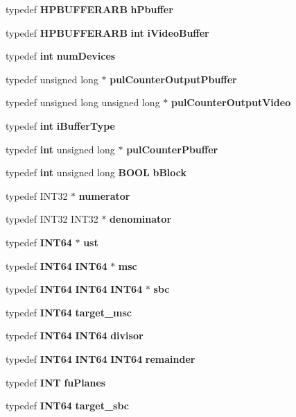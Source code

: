 \begin{DoxyCompactItemize}
\item 
typedef {\bf H\+P\+B\+U\+F\+F\+E\+R\+A\+RB} {\bf h\+Pbuffer}
\item 
typedef {\bf H\+P\+B\+U\+F\+F\+E\+R\+A\+RB} {\bf int} {\bf i\+Video\+Buffer}
\item 
typedef {\bf int} {\bf num\+Devices}
\item 
typedef unsigned long $\ast$ {\bf pul\+Counter\+Output\+Pbuffer}
\item 
typedef unsigned long unsigned long $\ast$ {\bf pul\+Counter\+Output\+Video}
\item 
typedef {\bf int} {\bf i\+Buffer\+Type}
\item 
typedef {\bf int} unsigned long $\ast$ {\bf pul\+Counter\+Pbuffer}
\item 
typedef {\bf int} unsigned long {\bf B\+O\+OL} {\bf b\+Block}
\item 
typedef I\+N\+T32 $\ast$ {\bf numerator}
\item 
typedef I\+N\+T32 I\+N\+T32 $\ast$ {\bf denominator}
\item 
typedef {\bf I\+N\+T64} $\ast$ {\bf ust}
\item 
typedef {\bf I\+N\+T64} {\bf I\+N\+T64} $\ast$ {\bf msc}
\item 
typedef {\bf I\+N\+T64} {\bf I\+N\+T64} {\bf I\+N\+T64} $\ast$ {\bf sbc}
\item 
typedef {\bf I\+N\+T64} {\bf target\+\_\+msc}
\item 
typedef {\bf I\+N\+T64} {\bf I\+N\+T64} {\bf divisor}
\item 
typedef {\bf I\+N\+T64} {\bf I\+N\+T64} {\bf I\+N\+T64} {\bf remainder}
\item 
typedef {\bf I\+NT} {\bf fu\+Planes}
\item 
typedef {\bf I\+N\+T64} {\bf target\+\_\+sbc}
\end{DoxyCompactItemize}
